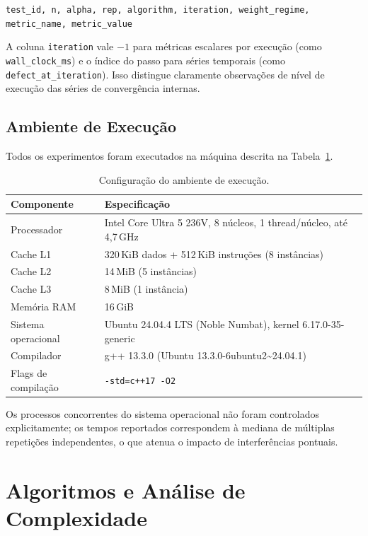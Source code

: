 \documentclass{infufrgs}
\begin{document}
\begin{center}
\texttt{test\_id, n, alpha, rep, algorithm, iteration, weight\_regime, metric\_name, metric\_value}
\end{center}

A coluna \texttt{iteration} vale $-1$ para métricas escalares por execução (como \texttt{wall\_clock\_ms}) e o índice do passo para séries temporais (como \texttt{defect\_at\_iteration}). Isso distingue claramente observações de nível de execução das séries de convergência internas.

\subsection{Ambiente de Execução}

Todos os experimentos foram executados na máquina descrita na Tabela~\ref{tab:ambiente}.

\begin{table}[H]
\centering
\caption{Configuração do ambiente de execução.}
\label{tab:ambiente}
\begin{tabular}{ll}
\toprule
\textbf{Componente} & \textbf{Especificação} \\
\midrule
Processador   & Intel Core Ultra 5 236V, 8 núcleos, 1 thread/núcleo, até 4{,}7\,GHz \\
Cache L1      & 320\,KiB dados + 512\,KiB instruções (8 instâncias) \\
Cache L2      & 14\,MiB (5 instâncias) \\
Cache L3      & 8\,MiB (1 instância) \\
Memória RAM   & 16\,GiB \\
Sistema operacional & Ubuntu 24.04.4 LTS (Noble Numbat), kernel 6.17.0-35-generic \\
Compilador    & g++ 13.3.0 (Ubuntu 13.3.0-6ubuntu2\textasciitilde24.04.1) \\
Flags de compilação & \texttt{-std=c++17 -O2} \\
\bottomrule
\end{tabular}
\end{table}

Os processos concorrentes do sistema operacional não foram controlados explicitamente; os tempos reportados correspondem à mediana de múltiplas repetições independentes, o que atenua o impacto de interferências pontuais.

\section{Algoritmos e Análise de Complexidade}
\end{document}
